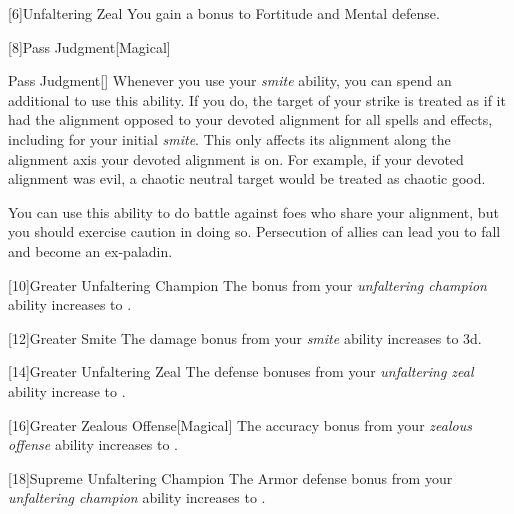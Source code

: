         [6]{Unfaltering Zeal}
        You gain a  bonus to Fortitude and Mental defense.

        [8]{Pass Judgment}[Magical]
        \begin{ability}{Pass Judgment}[]
            Whenever you use your \textit{smite} ability, you can spend an additional  to use this ability.
            If you do, the target of your strike is treated as if it had the alignment opposed to your devoted alignment for all spells and effects, including for your initial \textit{smite}.
            This only affects its alignment along the alignment axis your devoted alignment is on.
            For example, if your devoted alignment was evil, a chaotic neutral target would be treated as chaotic good.

            You can use this ability to do battle against foes who share your alignment, but you should exercise caution in doing so.
            Persecution of allies can lead you to fall and become an ex-paladin.
        \end{ability}

        [10]{Greater Unfaltering Champion} The  bonus from your \textit{unfaltering champion} ability increases to .

        [12]{Greater Smite} The damage bonus from your \textit{smite} ability increases to \plus3d.

        [14]{Greater Unfaltering Zeal} The defense bonuses from your \textit{unfaltering zeal} ability increase to .

        [16]{Greater Zealous Offense}[Magical]
        The accuracy bonus from your \textit{zealous offense} ability increases to .

        [18]{Supreme Unfaltering Champion}
        The Armor defense bonus from your \textit{unfaltering champion} ability increases to .


